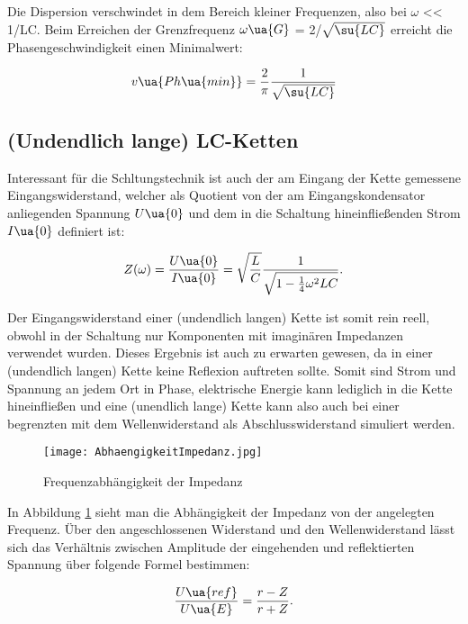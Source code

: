 Die Dispersion verschwindet in dem Bereich kleiner Frequenzen, also bei $\omega$
<< 1/LC. Beim Erreichen der Grenzfrequenz $\omega\ua{G}$ = 2/$\sqrt{\su{LC}}$ erreicht
die Phasengeschwindigkeit einen Minimalwert:

\begin{equation}
  v\ua{Ph\ua{min}} =  \frac{2}{\pi} \frac{1}{\sqrt{\su{LC}}}
  \label{eqn:Phasengeschwindigkeit}
\end{equation}

\subsection{(Undendlich lange) LC-Ketten}

Interessant für die Schltungstechnik ist auch der am Eingang der Kette gemessene
Eingangswiderstand, welcher als Quotient von der am Eingangskondensator anliegenden
Spannung $U\ua{0}$ und dem in die Schaltung hineinfließenden Strom $I\ua{0}$
definiert ist:

\begin{equation}
  Z(\omega) = \frac{U\ua{0}}{I\ua{0}} = \sqrt{ \frac{L}{C}} \frac{1}{ \sqrt{1 - \frac{1}{4} \omega^2 LC} }.
\end{equation}

Der Eingangswiderstand einer (undendlich langen) Kette ist somit rein reell,
obwohl in der Schaltung nur Komponenten mit imaginären Impedanzen verwendet wurden.
Dieses Ergebnis ist auch zu erwarten gewesen, da in einer (undendlich langen) Kette
keine Reflexion auftreten sollte. Somit sind Strom und Spannung an jedem Ort in
Phase, elektrische Energie kann lediglich in die Kette hineinfließen und eine
(unendlich lange) Kette kann also auch bei einer begrenzten mit dem Wellenwiderstand
als Abschlusswiderstand simuliert werden.

\begin{figure}
  \texttt{[image: AbhaengigkeitImpedanz.jpg]}
  \caption{Frequenzabhängigkeit der Impedanz}
  \label{fig:Impedanzabhängigkeit}
\end{figure}

In Abbildung \ref{fig:Impedanzabhängigkeit} sieht man die Abhängigkeit der Impedanz
von der angelegten Frequenz.
Über den angeschlossenen Widerstand und den Wellenwiderstand lässt sich das
Verhältnis zwischen Amplitude der eingehenden und reflektierten Spannung über folgende
Formel bestimmen:

\begin{equation}
  \frac{U\ua{ref}}{U\ua{E}} = \frac{r - Z}{r + Z}.
\end{equation}


